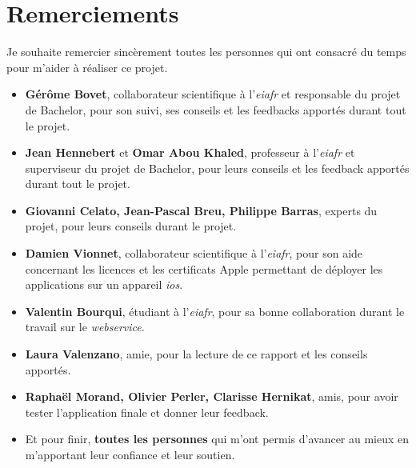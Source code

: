 
\chapter*{Remerciements}
Je souhaite remercier sincèrement toutes les personnes qui ont consacré du temps pour m'aider à réaliser ce projet.

\medskip

\begin{itemize}

	\item \textbf{Gérôme Bovet}, collaborateur scientifique à l'\emph{\gls{eiafr}} et responsable du projet de Bachelor, pour son suivi, ses conseils et les feedbacks apportés durant tout le projet.
	\medskip
	\item \textbf{Jean Hennebert} et \textbf{Omar Abou Khaled}, professeur à l'\emph{\gls{eiafr}} et superviseur du projet de Bachelor, pour leurs conseils et les feedback apportés durant tout le projet.
	\medskip
	\item \textbf{Giovanni Celato, Jean-Pascal Breu, Philippe Barras}, experts du projet, pour leurs conseils durant le projet.
	\medskip
	\item \textbf{Damien Vionnet}, collaborateur scientifique à l'\emph{\gls{eiafr}}, pour son aide concernant les licences et les certificats Apple permettant de déployer les applications sur un appareil \emph{\gls{ios}}.
	\medskip
	\item \textbf{Valentin Bourqui}, étudiant à l'\emph{\gls{eiafr}}, pour sa bonne collaboration durant le travail sur le \emph{\gls{webservice}}.
	\medskip
	\item \textbf{Laura Valenzano}, amie, pour la lecture de ce rapport et les conseils apportés.
	\medskip
	\item \textbf{Raphaël Morand, Olivier Perler, Clarisse Hernikat}, amis, pour avoir tester l'application finale et donner leur feedback.
	\medskip
	\item Et pour finir, \textbf{toutes les personnes} qui m'ont permis d'avancer au mieux en m'apportant leur confiance et leur soutien.

\end{itemize}